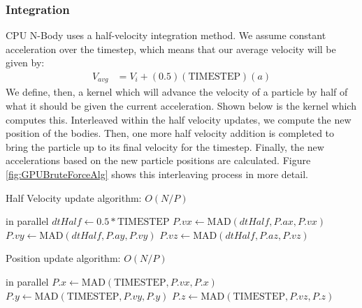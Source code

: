 \documentclass{thesis}
\begin{document}
\subsubsection{Integration}
CPU N-Body uses a half-velocity integration method. We assume constant acceleration over the timestep, which means that our average velocity will be given by:
\begin{align}
    V_{avg} &= V_i + (0.5)(\text{TIMESTEP})(a)
\end{align}
We define, then, a kernel which will advance the velocity of a particle by half of what it should be given the current acceleration. Shown below is the kernel which computes this.
Interleaved within the half velocity updates, we compute the new position of the bodies. Then, one more half velocity addition is completed to bring the particle up to its final velocity for the timestep. Finally, the new accelerations based on the new particle positions are calculated. Figure \ref{fig:GPUBruteForceAlg} shows this interleaving process in more detail.
\begin{algorithm}
    \label{alg:HalfVelocity}
    \caption{Half Velocity update algorithm: $O(N/P)$}
    \begin{algorithmic}
         in parallel
            \State $dtHalf \gets 0.5 * \text{TIMESTEP}$
            \State $P.vx \gets \text{MAD}(dtHalf, P.ax, P.vx)$
            \State $P.vy \gets \text{MAD}(dtHalf, P.ay, P.vy)$
            \State $P.vz \gets \text{MAD}(dtHalf, P.az, P.vz)$
        \EndFor
    \end{algorithmic}
\end{algorithm}
\begin{algorithm}
    \label{alg:PositionUpdate}
    \caption{Position update algorithm: $O(N/P)$}
    \begin{algorithmic}
         in parallel
            \State $P.x \gets \text{MAD}(\text{TIMESTEP}, P.vx, P.x)$
            \State $P.y \gets \text{MAD}(\text{TIMESTEP}, P.vy, P.y)$
            \State $P.z \gets \text{MAD}(\text{TIMESTEP}, P.vz, P.z)$
        \EndFor
    \end{algorithmic}
\end{algorithm}
\end{document}
